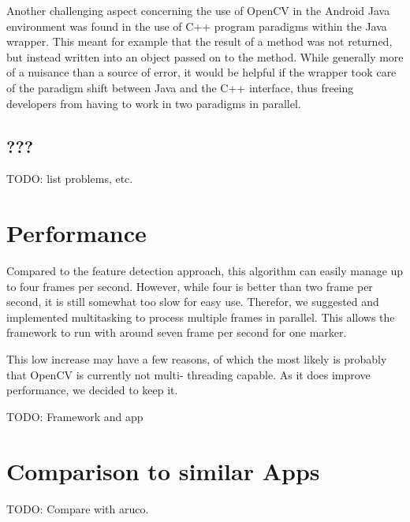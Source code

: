 Another challenging aspect concerning the use of OpenCV in the Android Java environment was found in the use of C++ program paradigms within the Java wrapper.
This meant for example that the result of a method was not returned, but instead written into an object passed on to the method.
While generally more of a nuisance than a source of error, it would be helpful if the wrapper took care of the paradigm shift between Java and the C++ interface, thus freeing developers from having to work in two paradigms in parallel.

\subsection{???}

TODO: list problems, etc.

\section{Performance}
\label{performance}

Compared to the feature detection approach, this algorithm can easily manage up to four frames per second.
However, while four is better than two frame per second, it is still somewhat too slow for easy use.
Therefor, we suggested and implemented multitasking to process multiple frames in parallel.
This allows the framework to run with around seven frame per second for one marker.

This low increase may have a few reasons, of which the most likely is probably that OpenCV is currently not multi-
threading capable.
As it does improve performance, we decided to keep it.

TODO: Framework and app

\section{Comparison to similar Apps}

TODO: Compare with aruco.
